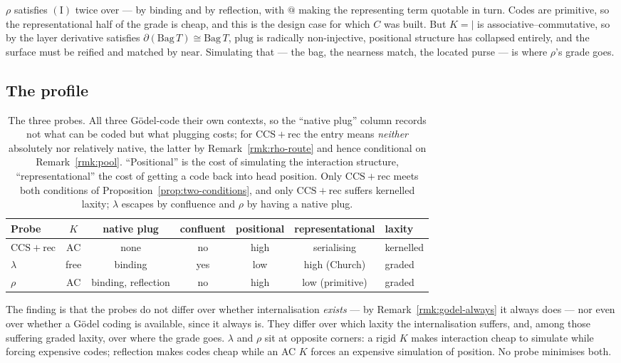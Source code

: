 \documentclass[11pt,a4paper]{article}
\theoremstyle{definition}
\theoremstyle{plain}
\theoremstyle{remark}
\newcommand{\rhoc}{\rho}
\newcommand{\CCSrec}{\mathrm{CCS}{+}\mathrm{rec}}
\newcommand{\near}{\mathrm{near}}
\newcommand{\Icond}{(\mathrm{I})}
\begin{document}
$\rhoc$ satisfies $\Icond$ twice over --- by binding and by reflection, with $@$ making the
representing term quotable in turn. Codes are primitive, so the representational half of the grade is
cheap, and this is the design case for which $C$ was built. But $K = {\mid}$ is associative--commutative,
so by \cite[\S2.3]{probe} the layer derivative satisfies $\partial(\mathrm{Bag}\,T) \cong
\mathrm{Bag}\,T$, $\mathrm{plug}$ is radically non-injective, positional structure has collapsed
entirely, and the surface must be reified and matched by $\near$. Simulating that --- the bag, the
nearness match, the located purse --- is where $\rhoc$'s grade goes.

\subsection{The profile}

\begin{table}[h]
\centering
\begin{tabular}{@{}lcccccl@{}}
\toprule
Probe & $K$ & native plug & confluent & positional & representational & laxity \\
\midrule
$\CCSrec$ & AC & none & no & high & serialising & kernelled \\
$\lambda$ & free & binding & yes & low & high (Church) & graded \\
$\rhoc$ & AC & binding, reflection & no & high & low (primitive) & graded \\
\bottomrule
\end{tabular}
\caption{The three probes. All three Gödel-code their own contexts, so the ``native plug'' column
records not what can be coded but what plugging costs; for $\CCSrec$ the entry means \emph{neither}
absolutely nor relatively native, the latter by Remark~\ref{rmk:rho-route} and hence conditional on
Remark~\ref{rmk:pool}. ``Positional'' is the cost of simulating the interaction structure,
``representational'' the cost of getting a code back into head position. Only $\CCSrec$ meets both
conditions of Proposition~\ref{prop:two-conditions}, and only $\CCSrec$ suffers kernelled laxity;
$\lambda$ escapes by confluence and $\rhoc$ by having a native plug.}
\label{tab:probes}
\end{table}

The finding is that the probes do not differ over whether internalisation \emph{exists} --- by
Remark~\ref{rmk:godel-always} it always does --- nor even over whether a Gödel coding is available,
since it always is. They differ over which laxity the internalisation suffers, and, among those
suffering graded laxity, over where the grade goes. $\lambda$ and $\rhoc$ sit at opposite corners: a
rigid $K$ makes interaction cheap to simulate while forcing expensive codes; reflection makes codes
cheap while an AC $K$ forces an expensive simulation of position. No probe minimises both.
\end{document}
